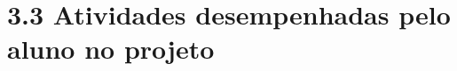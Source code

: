\hypertarget{__RefHeading___Toc4783_3118176633}{}
\section*{3.3 Atividades desempenhadas pelo aluno no projeto}
\label{ages-ii:text-h-0047}

